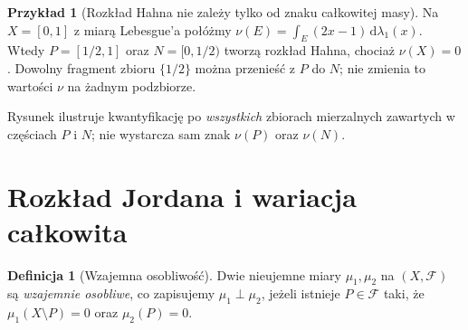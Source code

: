 \documentclass[11pt,a4paper,oneside]{book}
\numberwithin{equation}{chapter}
\theoremstyle{plain}
\theoremstyle{definition}
\newtheorem{definicja}[twierdzenie]{Definicja}
\newtheorem{przyklad}[twierdzenie]{Przykład}
\theoremstyle{remark}
\begin{document}
\begin{przyklad}[Rozkład Hahna nie zależy tylko od znaku całkowitej masy]
Na $X=[0,1]$ z miarą Lebesgue'a połóżmy
$\nu(E)=\int_E(2x-1)\,\mathrm d\lambda_1(x)$.
Wtedy $P=[1/2,1]$ oraz $N=[0,1/2)$ tworzą rozkład
Hahna, chociaż $\nu(X)=0$. Dowolny fragment
zbioru $\{1/2\}$ można przenieść z $P$ do $N$;
nie zmienia to wartości $\nu$ na żadnym podzbiorze.
\end{przyklad}

\begin{center}
\end{center}
\noindent Rysunek ilustruje kwantyfikację po \emph{wszystkich}
zbiorach mierzalnych zawartych w częściach $P$ i $N$;
nie wystarcza sam znak $\nu(P)$ oraz $\nu(N)$.

\section{Rozkład Jordana i wariacja całkowita}
\begin{definicja}[Wzajemna osobliwość]
\label{def:singular-16}
Dwie nieujemne miary $\mu_1,\mu_2$ na
$(X,\mathcal F)$ są \emph{wzajemnie osobliwe}, co zapisujemy
$\mu_1\perp\mu_2$, jeżeli istnieje $P\in\mathcal F$
taki, że $\mu_1(X\setminus P)=0$ oraz $\mu_2(P)=0$.
\end{definicja}
\end{document}
